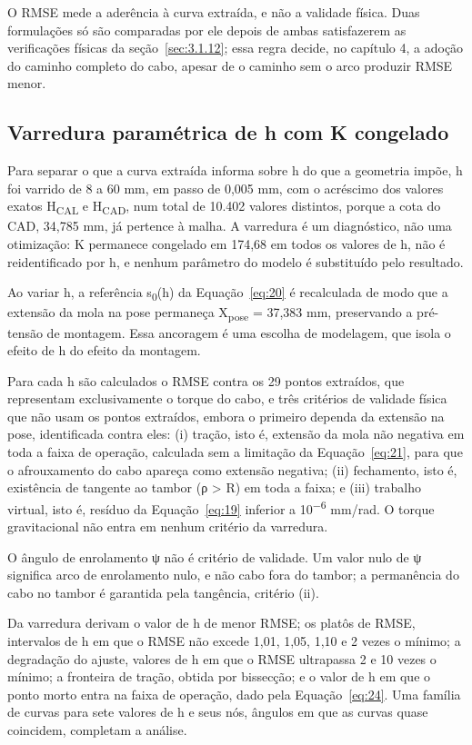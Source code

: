 O RMSE mede a aderência à curva extraída, e não a validade física. Duas formulações só são comparadas por ele depois de ambas satisfazerem as verificações físicas da seção~\ref{sec:3.1.12}; essa regra decide, no capítulo 4, a adoção do caminho completo do cabo, apesar de o caminho sem o arco produzir RMSE menor.

\subsection{Varredura paramétrica de h com K congelado}\label{sec:3.1.11}

Para separar o que a curva extraída informa sobre h do que a geometria impõe, h foi varrido de 8 a 60 mm, em passo de 0,005 mm, com o acréscimo dos valores exatos H\textsubscript{CAL} e H\textsubscript{CAD}, num total de 10.402 valores distintos, porque a cota do CAD, 34,785 mm, já pertence à malha. A varredura é um diagnóstico, não uma otimização: K permanece congelado em 174,68 em todos os valores de h, não é reidentificado por h, e nenhum parâmetro do modelo é substituído pelo resultado.

Ao variar h, a referência s\textsubscript{0}(h) da Equação~\eqref{eq:20} é recalculada de modo que a extensão da mola na pose permaneça X\textsubscript{pose} = 37,383 mm, preservando a pré-tensão de montagem. Essa ancoragem é uma escolha de modelagem, que isola o efeito de h do efeito da montagem.

Para cada h são calculados o RMSE contra os 29 pontos extraídos, que representam exclusivamente o torque do cabo, e três critérios de validade física que não usam os pontos extraídos, embora o primeiro dependa da extensão na pose, identificada contra eles: (i) tração, isto é, extensão da mola não negativa em toda a faixa de operação, calculada sem a limitação da Equação~\eqref{eq:21}, para que o afrouxamento do cabo apareça como extensão negativa; (ii) fechamento, isto é, existência de tangente ao tambor (ρ > R) em toda a faixa; e (iii) trabalho virtual, isto é, resíduo da Equação~\eqref{eq:19} inferior a 10\textsuperscript{−6} mm/rad. O torque gravitacional não entra em nenhum critério da varredura.

O ângulo de enrolamento ψ não é critério de validade. Um valor nulo de ψ significa arco de enrolamento nulo, e não cabo fora do tambor; a permanência do cabo no tambor é garantida pela tangência, critério (ii).

Da varredura derivam o valor de h de menor RMSE; os platôs de RMSE, intervalos de h em que o RMSE não excede 1,01, 1,05, 1,10 e 2 vezes o mínimo; a degradação do ajuste, valores de h em que o RMSE ultrapassa 2 e 10 vezes o mínimo; a fronteira de tração, obtida por bissecção; e o valor de h em que o ponto morto entra na faixa de operação, dado pela Equação~\eqref{eq:24}. Uma família de curvas para sete valores de h e seus nós, ângulos em que as curvas quase coincidem, completam a análise.

